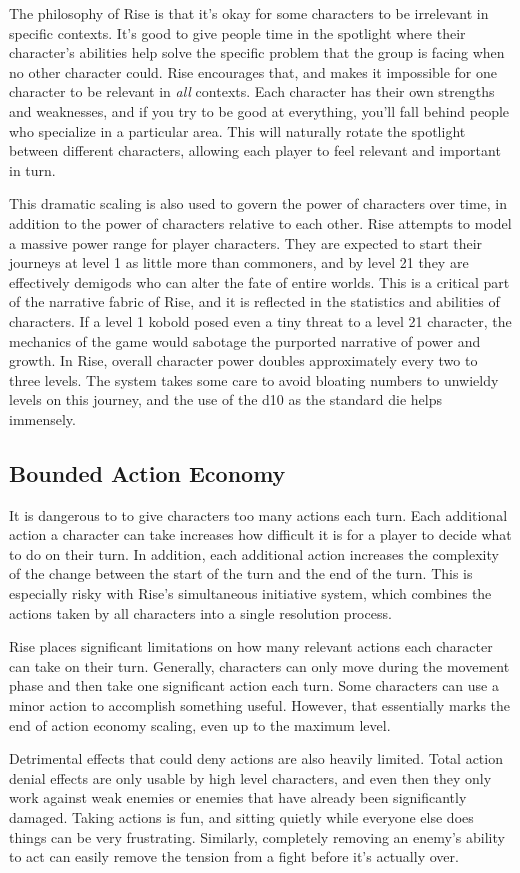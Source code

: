     The philosophy of Rise is that it's okay for some characters to be irrelevant in specific contexts.
    It's good to give people time in the spotlight where their character's abilities help solve the specific problem that the group is facing when no other character could.
    Rise encourages that, and makes it impossible for one character to be relevant in \textit{all} contexts.
    Each character has their own strengths and weaknesses, and if you try to be good at everything, you'll fall behind people who specialize in a particular area.
    This will naturally rotate the spotlight between different characters, allowing each player to feel relevant and important in turn.

    This dramatic scaling is also used to govern the power of characters over time, in addition to the power of characters relative to each other.
    Rise attempts to model a massive power range for player characters.
    They are expected to start their journeys at level 1 as little more than commoners, and by level 21 they are effectively demigods who can alter the fate of entire worlds.
    This is a critical part of the narrative fabric of Rise, and it is reflected in the statistics and abilities of characters.
    If a level 1 kobold posed even a tiny threat to a level 21 character, the mechanics of the game would sabotage the purported narrative of power and growth.
    In Rise, overall character power doubles approximately every two to three levels.
    The system takes some care to avoid bloating numbers to unwieldy levels on this journey, and the use of the d10 as the standard die helps immensely.

  \subsection{Bounded Action Economy}
    It is dangerous to to give characters too many actions each turn.
    Each additional action a character can take increases how difficult it is for a player to decide what to do on their turn.
    In addition, each additional action increases the complexity of the change between the start of the turn and the end of the turn.
    This is especially risky with Rise's simultaneous initiative system, which combines the actions taken by all characters into a single resolution process.

    Rise places significant limitations on how many relevant actions each character can take on their turn.
    Generally, characters can only move during the movement phase and then take one significant action each turn.
    Some characters can use a minor action to accomplish something useful.
    However, that essentially marks the end of action economy scaling, even up to the maximum level.

    Detrimental effects that could deny actions are also heavily limited.
    Total action denial effects are only usable by high level characters, and even then they only work against weak enemies or enemies that have already been significantly damaged.
    Taking actions is fun, and sitting quietly while everyone else does things can be very frustrating.
    Similarly, completely removing an enemy's ability to act can easily remove the tension from a fight before it's actually over.
